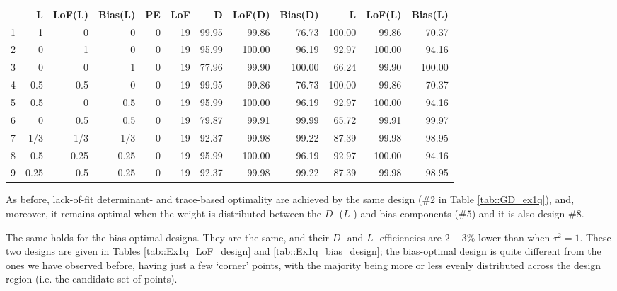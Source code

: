 \begin{table}[h]
{\begin{tabular}{rrrrrrrrrrrr}
   & \textbf{L}       & \textbf{LoF(L)}    & \textbf{Bias(L)}   & \textbf{PE}        & \textbf{LoF}        & \textbf{D}   & \textbf{LoF(D)}   & \textbf{Bias(D)}  & \textbf{L}       & \textbf{LoF(L)}   & \textbf{Bias(L)}  \\
1 & 1 & 0 & 0 & \multicolumn{1}{|r}{0} & 19 & \multicolumn{1}{|r}{99.95} & 99.86 & 76.73 & \multicolumn{1}{|r}{100.00} & 99.86 & 70.37 \\
2 & 0 & 1 & 0 & \multicolumn{1}{|r}{0} & 19 & \multicolumn{1}{|r}{95.99} & 100.00 & 96.19 & \multicolumn{1}{|r}{92.97} & 100.00 & 94.16 \\
3 & 0 & 0 & 1 & \multicolumn{1}{|r}{0} & 19 & \multicolumn{1}{|r}{77.96} & 99.90 & 100.00 & \multicolumn{1}{|r}{66.24} & 99.90 & 100.00 \\
4 & 0.5 & 0.5 & 0 & \multicolumn{1}{|r}{0} & 19 & \multicolumn{1}{|r}{99.95} & 99.86 & 76.73 & \multicolumn{1}{|r}{100.00} & 99.86 & 70.37 \\
5 & 0.5 & 0 & 0.5 & \multicolumn{1}{|r}{0} & 19 & \multicolumn{1}{|r}{95.99} & 100.00 & 96.19 & \multicolumn{1}{|r}{92.97} & 100.00 & 94.16 \\
6 & 0 & 0.5 & 0.5 & \multicolumn{1}{|r}{0} & 19 & \multicolumn{1}{|r}{79.87} & 99.91 & 99.99 & \multicolumn{1}{|r}{65.72} & 99.91 & 99.97 \\
7 & 1/3 & 1/3 & 1/3 & \multicolumn{1}{|r}{0} & 19 & \multicolumn{1}{|r}{92.37} & 99.98 & 99.22 & \multicolumn{1}{|r}{87.39} & 99.98 & 98.95 \\
8 & 0.5 & 0.25 & 0.25 & \multicolumn{1}{|r}{0} & 19 & \multicolumn{1}{|r}{95.99} & 100.00 & 96.19 & \multicolumn{1}{|r}{92.97} & 100.00 & 94.16 \\
9 & 0.25 & 0.5 & 0.25 & \multicolumn{1}{|r}{0} & 19 & \multicolumn{1}{|r}{92.37} & 99.98 & 99.22 & \multicolumn{1}{|r}{87.39} & 99.98 & 98.95
\end{tabular}
}
\end{table}
As before, lack-of-fit determinant- and trace-based optimality are achieved by the same design (\#$2$ in Table \ref{tab::GD_ex1q}), and, moreover, it remains optimal when the weight is distributed between the $D$- ($L$-) and bias components (\#$5$) and it is also design \#$8$. 

The same holds for the bias-optimal designs. They are the same, and their $D$- and $L$- efficiencies are  $2-3\%$ lower than when $\tau^2=1$. These two designs are given in Tables \ref{tab::Ex1q_LoF_design} and \ref{tab::Ex1q_bias_design}; the bias-optimal design is quite different from the ones we have observed before, having just a few `corner' points, with the majority being more or less evenly distributed across the design region (i.e. the candidate set of points).

